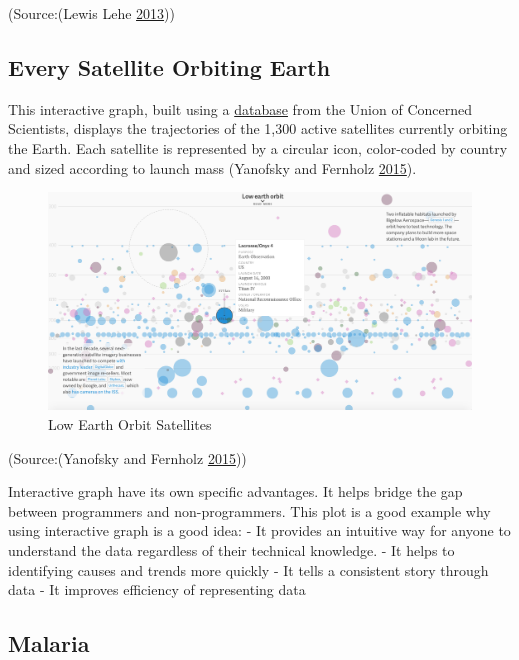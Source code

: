 \documentclass[]{book}
\begin{document}
(Source:(Lewis Lehe \protect\hyperlink{ref-simpson_paradox}{2013}))

\subsection{Every Satellite Orbiting
Earth}\label{every-satellite-orbiting-earth}

This interactive graph, built using a
\href{https://www.ucsusa.org/nuclear-weapons/space-weapons/satellite-database\#.WxbaMVMvzq1}{database}
from the Union of Concerned Scientists, displays the trajectories of the
1,300 active satellites currently orbiting the Earth. Each satellite is
represented by a circular icon, color-coded by country and sized
according to launch mass (Yanofsky and Fernholz
\protect\hyperlink{ref-Satellite}{2015}).

\begin{figure}
\centering
\includegraphics{images/satellites.png}
\caption{Low Earth Orbit Satellites}
\end{figure}

(Source:(Yanofsky and Fernholz \protect\hyperlink{ref-Satellite}{2015}))

Interactive graph have its own specific advantages. It helps bridge the
gap between programmers and non-programmers. This plot is a good example
why using interactive graph is a good idea: - It provides an intuitive
way for anyone to understand the data regardless of their technical
knowledge. - It helps to identifying causes and trends more quickly - It
tells a consistent story through data - It improves efficiency of
representing data

\subsection{Malaria}\label{malaria}
\end{document}

